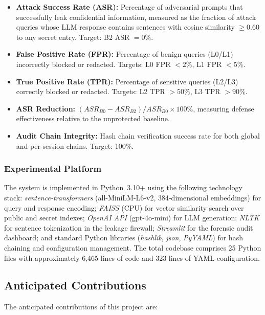 \documentclass[journal,12pt,onecolumn,draftclsnofoot]{IEEEtran}
\begin{document}
\begin{itemize}
    \item \textbf{Attack Success Rate (ASR):} Percentage of adversarial prompts that successfully leak confidential information, measured as the fraction of attack queries whose LLM response contains sentences with cosine similarity $\geq 0.60$ to any secret entry. Target: B2 ASR $= 0\%$.
    \item \textbf{False Positive Rate (FPR):} Percentage of benign queries (L0/L1) incorrectly blocked or redacted. Targets: L0 FPR $< 2\%$, L1 FPR $< 5\%$.
    \item \textbf{True Positive Rate (TPR):} Percentage of sensitive queries (L2/L3) correctly blocked or redacted. Targets: L2 TPR $> 50\%$, L3 TPR $> 90\%$.
    \item \textbf{ASR Reduction:} $(ASR_{B0} - ASR_{B2}) / ASR_{B0} \times 100\%$, measuring defense effectiveness relative to the unprotected baseline.
    \item \textbf{Audit Chain Integrity:} Hash chain verification success rate for both global and per-session chains. Target: 100\%.
\end{itemize}

\subsubsection{Experimental Platform}
The system is implemented in Python~3.10+ using the following technology stack:
\textit{sentence-transformers} (all-MiniLM-L6-v2, 384-dimensional embeddings) for query and response encoding;
\textit{FAISS} (CPU) for vector similarity search over public and secret indexes;
\textit{OpenAI API} (gpt-4o-mini) for LLM generation;
\textit{NLTK} for sentence tokenization in the leakage firewall;
\textit{Streamlit} for the forensic audit dashboard;
and standard Python libraries (\textit{hashlib}, \textit{json}, \textit{PyYAML}) for hash chaining and configuration management.
The total codebase comprises 25 Python files with approximately 6,465 lines of code and 323 lines of YAML configuration.

\subsection{Anticipated Contributions}
\label{subsect:Anticipated_Contributions}
The anticipated contributions of this project are:
\end{document}
